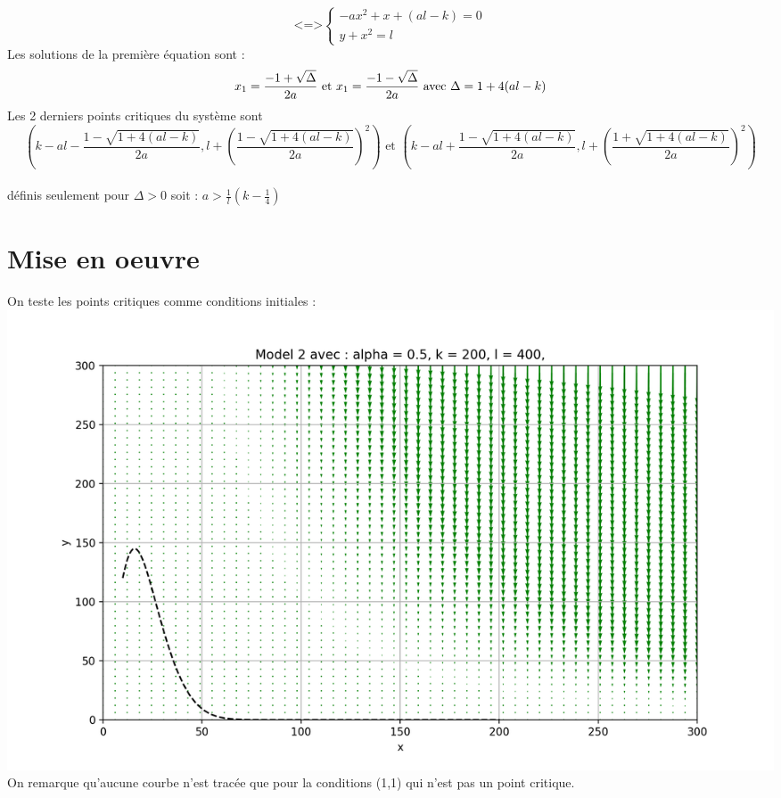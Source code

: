 \documentclass{article}
\begin{document}
$$
 \text{<=>}
\left\{
\begin{array}{ll}
-ax^{2}  +x + (al -k) =0\\
y + x^{2} = l
\end{array}
\right.
$$
Les solutions de la première équation sont :  
$$
x_{1} = \frac{-1 + \sqrt{\Delta}}{2a}  \text{ et } x_{1} = \frac{-1 - \sqrt{\Delta}}{2a}
\text{  avec  }  \Delta = 1 + 4(al -k)\\
$$
Les 2 derniers points critiques du système sont
$$
(k-al -  \frac{1 - \sqrt{ 1 + 4(al -k)}}{2a},l +  (\frac{1 - \sqrt{ 1 + 4(al -k)}}{2a})^{2}) \text{ et } (k-al +  \frac{1 - \sqrt{ 1 + 4(al -k)}}{2a},l +  (\frac{1 + \sqrt{ 1 + 4(al -k)}}{2a})^{2})
$$ 
\\définis seulement pour $\Delta > 0$ soit : $a > \frac{1}{l}(k - \frac{1}{4})$
\section{Mise en oeuvre}
On teste les points critiques comme conditions initiales : \\
\includegraphics[scale = 0.4]{../../pysrc/img/Model_2.png} \\
On remarque qu'aucune courbe n'est tracée que pour la conditions (1,1) qui n'est pas un point critique.
\end{document}

